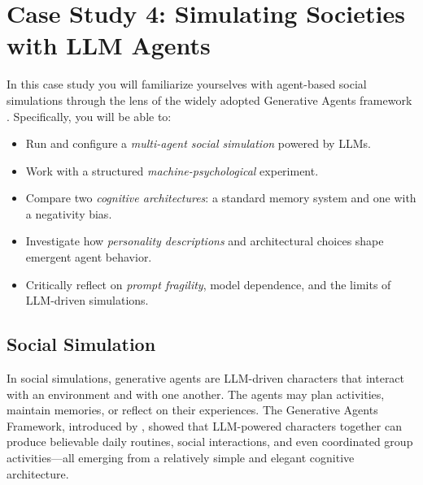 \chapter[Case Study 4: Simulating Societies]{Case Study 4: Simulating Societies with LLM Agents}\label{chap:generative_agents}


\begin{learningbox}

In this case study you will familiarize yourselves with agent-based social simulations through the lens of the widely adopted Generative Agents framework \citep{park2023generative}.
Specifically, you will be able to:

\begin{itemize}[leftmargin=*, nosep]
    \item Run and configure a {\em multi-agent social simulation} powered by LLMs.
    \item Work with a structured {\em machine-psychological} experiment.
    \item Compare two {\em cognitive architectures}: a standard memory system and one with a negativity bias.
    \item Investigate how {\em personality descriptions} and architectural choices shape emergent agent behavior.
    \item Critically reflect on {\em prompt fragility}, model dependence, and the limits of LLM-driven simulations.
\end{itemize}

\end{learningbox}


\section{Social Simulation}
In social simulations, generative agents are LLM-driven characters that interact with an environment and with one another. The agents may plan activities, maintain memories, or reflect on their experiences. The Generative Agents Framework, introduced by \citet{park2023generative}, showed that LLM-powered characters together can produce believable daily routines, social interactions, and even coordinated group activities---all emerging from a relatively simple and elegant cognitive architecture.

